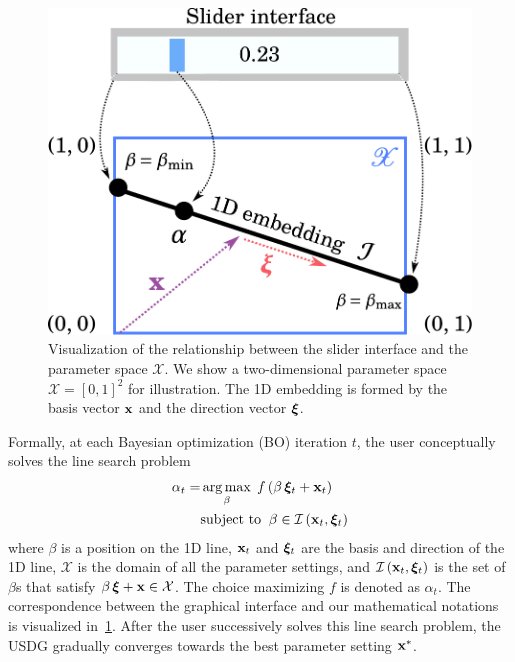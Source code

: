 \begin{figure}[t]
  \centering
  \includegraphics[scale=0.35]{figures/linesearch.pdf}
  \caption{Visualization of the relationship between the slider interface and the parameter space \(\mathcal{X}\).
    We show a two-dimensional parameter space \(\mathcal{X} = {[0, 1]}^2\) for illustration.
    The 1D embedding is formed by the basis vector \(\mathbf{x}\) and the direction vector \(\bm{\xi}\).
  }\label{fig:linesearch}
  \vspace{-0.15in}
\end{figure}
%
Formally, at each Bayesian optimization (BO) iteration \(t\), the user conceptually solves the line search problem
\begin{align}
 \alpha_t = &\operatorname*{arg\,max}_{ \beta }\; f\,(\beta\,\bm{\xi}_t + \mathbf{x}_t) \label{eq:line_search}\\
 &\text{subject to}\;\; \beta \in \mathcal{I}\left(\mathbf{x}_t, \bm{\xi}_t\right) \nonumber
\end{align}
{\noindent}where \(\beta\) is a position on the 1D line, \(\mathbf{x}_t\) and \(\bm{\xi}_t\) are the basis and direction of the 1D line, \(\mathcal{X}\) is the domain of all the parameter settings, and \(\mathcal{I}\left(\mathbf{x}_t, \bm{\xi}_t\right)\) is the set of \(\beta\)s that satisfy \(\beta\,\bm{\xi} + \mathbf{x}  \in \mathcal{X}\).
The choice maximizing \(f\) is denoted as \(\alpha_t\).
The correspondence between the graphical interface and our mathematical notations is visualized in~\cref{fig:linesearch}.
After the user successively solves this line search problem, the USDG gradually converges towards the best parameter setting \(\mathbf{x}^{*}\).

